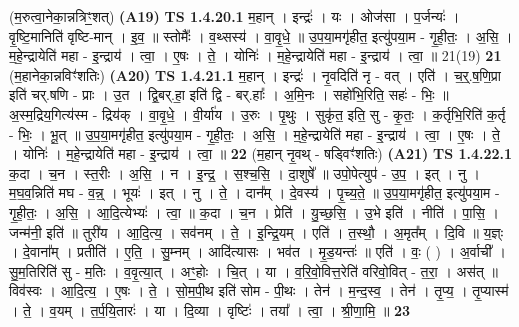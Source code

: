 \documentclass[17pt]{extarticle}
\begin{document}
                  \newline
                      (म॒रुत्वा॒नेका॒न्नत्रिꣳ॒॒शत्)  \textbf{(A19)} \newline \newline
                                \textbf{ TS 1.4.20.1} \newline
                  म॒हान् । इन्द्रः॑ । यः । ओज॑सा । प॒र्जन्यः॑ । वृ॒ष्टि॒मानिति॑ वृष्टि-मान् । इ॒व॒ ॥ स्तोमैः᳚ । व॒थ्सस्य॑ । वा॒वृ॒धे॒ ॥ उ॒प॒या॒मगृ॑हीत॒ इत्यु॑पया॒म - गृ॒ही॒तः॒ । अ॒सि॒ । म॒हे॒न्द्रायेति॑ महा - इ॒न्द्राय॑ । त्वा॒ । ए॒षः । ते॒ । योनिः॑ । म॒हे॒न्द्रायेति॑ महा - इ॒न्द्राय॑ । त्वा॒ ॥ 21(19) \textbf{  21} \newline
                  \newline
                      (म॒हानेका॒न्नविꣳ॑शतिः)  \textbf{(A20)} \newline \newline
                                \textbf{ TS 1.4.21.1} \newline
                  म॒हान् । इन्द्रः॑ । नृ॒वदिति॑ नृ - वत् । एति॑ । च॒र्॒.ष॒णि॒प्रा इति॑ चर्.षणि - प्राः । उ॒त । द्वि॒बर्.हा॒ इति॑ द्वि - बर्.हाः᳚ । अ॒मि॒नः । सहो॑भि॒रिति॒ सहः॑ - भिः॒ ॥ अ॒स्म॒द्रिय॒गित्य॑स्म - द्रिय॑क् । वा॒वृ॒धे॒ । वी॒र्या॑य । उ॒रुः । पृ॒थुः । सुकृ॑त॒ इति॒ सु - कृ॒तः॒ । क॒र्तृभि॒रिति॑ क॒र्तृ - भिः॒ । भू॒त् ॥ उ॒प॒या॒मगृ॑हीत॒ इत्यु॑पया॒म - गृ॒ही॒तः॒ । अ॒सि॒ । म॒हे॒न्द्रायेति॑ महा - इ॒न्द्राय॑ । त्वा॒ । ए॒षः । ते॒ । योनिः॑ । म॒हे॒न्द्रायेति॑ महा - इ॒न्द्राय॑ । त्वा॒ ॥ \textbf{  22} \newline
                  \newline
                      (म॒हान् नृ॒वथ् - षड्विꣳ॑शतिः)  \textbf{(A21)} \newline \newline
                                \textbf{ TS 1.4.22.1} \newline
                  क॒दा । च॒न । स्त॒रीः । अ॒सि॒ । न । इ॒न्द्र॒ । स॒श्च॒सि॒ । दा॒शुषे᳚ ॥ उपो॒पेत्युप॑ - उ॒प॒ । इत् । नु । म॒घ॒व॒न्निति॑ मघ - व॒न्न्॒ । भूयः॑ । इत् । नु । ते॒ । दान᳚म् । दे॒वस्य॑ । पृ॒च्य॒ते॒ ॥ उ॒प॒या॒मगृ॑हीत॒ इत्यु॑पया॒म - गृ॒ही॒तः॒ । अ॒सि॒ । आ॒दि॒त्येभ्यः॑ । त्वा॒ ॥ क॒दा । च॒न । प्रेति॑ । यु॒च्छ॒सि॒ । उ॒भे इति॑ । नीति॑ । पा॒सि॒ । जन्म॑नी॒ इति॑ ॥ तुरी॑य । आ॒दि॒त्य॒ । सव॑नम् । ते॒ । इ॒न्द्रि॒यम् । एति॑ । त॒स्थौ॒ । अ॒मृत᳚म् । दि॒वि ॥ य॒ज्ञ्ः । दे॒वाना᳚म् । प्रतीति॑ । ए॒ति॒ । सु॒म्नम् । आदि॑त्यासः । भव॑त । मृ॒ड॒यन्तः॑ ॥ एति॑ । वः॒ ( ) । अ॒र्वाची᳚ । सु॒म॒तिरिति॑ सु - म॒तिः । व॒वृ॒त्या॒त् । अꣳ॒॒होः । चि॒त् । या । व॒रि॒वो॒वित्त॒रेति॑ वरिवो॒वित् - त॒रा॒ । अस॑त् ॥ विव॑स्वः । आ॒दि॒त्य॒ । ए॒षः । ते॒ । सो॒म॒पी॒थ इति॑ सोम - पी॒थः । तेन॑ । म॒न्द॒स्व॒ । तेन॑ । तृ॒प्य॒ । तृ॒प्यास्म॑ । ते॒ । व॒यम् । त॒र्प॒यि॒तारः॑ । या । दि॒व्या । वृष्टिः॑ । तया᳚ । त्वा॒ । श्री॒णा॒मि॒ ॥ \textbf{  23 } \newline
\end{document}

